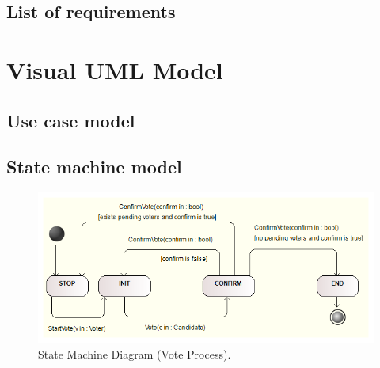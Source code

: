 \documentclass{article}
\begin{document}
\subsection{List of requirements}
\section{Visual UML Model}
\subsection{Use case model}
\subsection{State machine model}
\begin{figure}[h!]
\centering
	\includegraphics[width=\textwidth,height=\textheight,keepaspectratio]{state.png}
	\caption{State Machine Diagram (Vote Process).}
	\label{fig:PropProf}
\end{figure}
\end{document}
